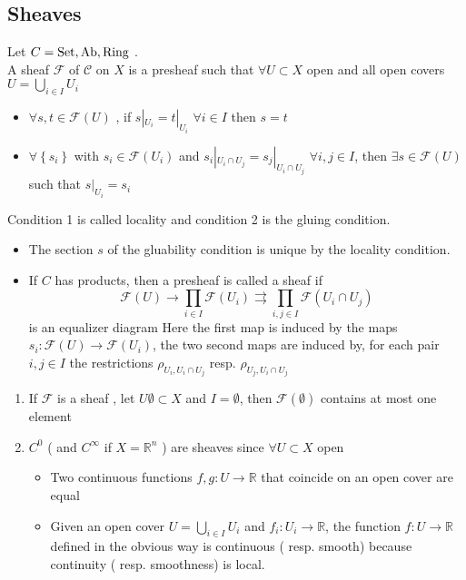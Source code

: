 \documentclass[../main.tex]{subfiles}
\begin{document}
\subsection{Sheaves}
\begin{defn}[Sheaf]
	Let $C = \operatorname{Set}, \operatorname{Ab}, \operatorname{Ring}$ .\\
	A sheaf $\mathcal{F}$ of $\mathcal{C}$ on $X$ is a presheaf such that $\forall U \subset X $ open and all open covers $U = \bigcup_{i \in I} U_i$ 
	\begin{itemize}
	\item $\forall s,t\in \mathcal{F}( U) $ , if $s|_{U_i} = t|_{U_i} $ $\forall i \in I$ then $s=t$
	\item  $\forall \left\{ s_i \right\} $ with $s_i\in \mathcal{F}( U_i) $ and $s_i|_{U_i \cap U_j} =s_j |_{ U_i \cap U_j} $ $\forall i,j\in I$, then $\exists s \in \mathcal{F}( U) $ such that $s|_{U_i} = s_i$ 
	\end{itemize}
\end{defn}
Condition 1 is called locality and condition 2 is the gluing condition.
\begin{rmq}
	\begin{itemize}
		\item The section $s$ of the gluability condition is unique by the locality condition.
	\item If $C$ has products, then a presheaf is called a sheaf if 
		\[ 
		\mathcal{F}( U) \to\prod_{i\in I} \mathcal{F}( U_i) \rightrightarrows  \prod_{i,j \in I} \mathcal{F}( U_i \cap U_j) 
		\]
		is an equalizer diagram
		Here the first map is induced by the maps $s_i: \mathcal{F}( U) \to \mathcal{F}( U_i)  $, the two second maps are induced by, for each pair $i,j \in I$ the restrictions $\rho_{U_i, U_i\cap U_j} $ resp. $\rho_{ U_j, U_i\cap U_j} $ 
		
	\end{itemize}
\end{rmq}
\begin{exemple}
\begin{enumerate}
\item If $\mathcal{F}$ is a sheaf , let $U \emptyset  \subset X$ and $I = \emptyset$, then $\mathcal{F}( \emptyset ) $ contains at most one element
\item $C^{0}$ ( and $C^{ \infty }$ if $X = \mathbb{R}^{n}$ ) are sheaves since $\forall U \subset X$ open
	\begin{itemize}
	\item Two continuous functions $f,g:U \to \mathbb{R}$ that coincide on an open cover are equal
	\item Given an open cover $U= \bigcup_{i \in I} U_i$ and $f_i: U_i \to \mathbb{R}$, the function $f:U \to \mathbb{R} $ defined in the obvious way is continuous ( resp. smooth) because continuity ( resp. smoothness) is local.
	\end{itemize}
\end{enumerate}
\end{exemple}
\end{document}
